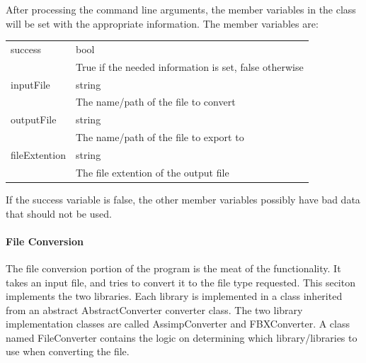     After processing the command line arguments, the member variables in the class will be set with the appropriate information.  The member variables are:

    \begin{tabular}{l l}
        \centering
        success & bool \\
        & True if the needed information is set, false otherwise \\

        inputFile & string \\
        & The name/path of the file to convert \\

        outputFile & string \\
        & The name/path of the file to export to \\

        fileExtention & string \\
        & The file extention of the output file
    \end{tabular}

    If the success variable is false, the other member variables possibly have bad data that should not be used.

    \paragraph{File Conversion}
    \hfill \break
    The file conversion portion of the program is the meat of the functionality.  It takes an input file, and tries to convert it to the file type requested.
    This seciton implements the two libraries.  Each library is implemented in a class inherited from an abstract AbstractConverter converter class.  The two 
    library implementation classes are called AssimpConverter and FBXConverter.  A class named FileConverter contains the logic on determining which 
    library/libraries to use when converting the file.

